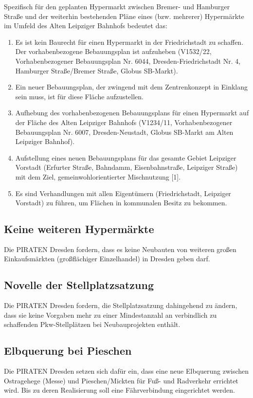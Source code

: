 \documentclass[a4paper, 11pt]{article}
\begin{document}
Spezifisch für den geplanten Hypermarkt zwischen Bremer- und Hamburger Straße und der weiterhin bestehenden Pläne eines (bzw. mehrerer) Hypermärkte im Umfeld des Alten Leipziger Bahnhofs bedeutet das:

\begin{enumerate}

\item Es ist kein Baurecht für einen Hypermarkt in der Friedrichstadt zu schaffen. Der vorhabenbezogene Bebauungsplan ist aufzuheben (V1532/22, Vorhabenbezogener Bebauungsplan Nr. 6044, Dresden-Friedrichstadt Nr. 4, Hamburger Straße/Bremer Straße, Globus SB-Markt).
\item Ein neuer Bebauungsplan, der zwingend mit dem Zentrenkonzept in Einklang sein muss, ist für diese Fläche aufzustellen.
\item Aufhebung des vorhabenbezogenen Bebauungsplans für einen Hypermarkt auf der Fläche des Alten Leipziger Bahnhofs (V1234/11, Vorhabenbezogener Bebauungsplan Nr. 6007, Dresden-Neustadt, Globus SB-Markt am Alten Leipziger Bahnhof).
\item Aufstellung eines neuen Bebauungsplans für das gesamte Gebiet Leipziger Vorstadt (Erfurter Straße, Bahndamm, Eisenbahnstraße, Leipziger Straße) mit dem Ziel, gemeinwohlorientierter Mischnutzung [1].
\item Es sind Verhandlungen mit allen Eigentümern (Friedrichstadt, Leipziger Vorstadt) zu führen, um Flächen in kommunalen Besitz zu bekommen.
\end{enumerate}


\subsection{Keine weiteren Hypermärkte}
Die PIRATEN Dresden fordern, dass es keine Neubauten von weiteren großen Einkaufsmärkten (großflächiger Einzelhandel) in Dresden geben darf.

\subsection{Novelle der Stellplatzsatzung}
Die PIRATEN Dresden fordern, die Stellplatzsatzung dahingehend zu ändern, dass sie keine Vorgaben mehr zu einer Mindestanzahl an verbindlich zu schaffenden Pkw-Stellplätzen bei Neubauprojekten enthält.

\subsection{Elbquerung bei Pieschen}
Die PIRATEN Dresden setzen sich dafür ein, dass eine neue Elbquerung zwischen Ostragehege (Messe) und Pieschen/Mickten für Fuß- und Radverkehr errichtet wird. Bis zu deren Realisierung soll eine Fährverbindung eingerichtet werden.
\end{document}
